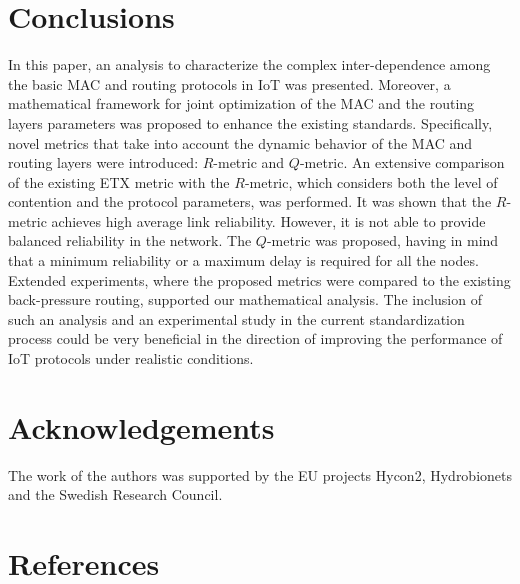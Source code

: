 \documentclass[review, 1p, 11pt]{elsarticle}
\numberwithin{equation}{section}
\begin{document}
\section{Conclusions} \label{sec:conclusions}
In this paper, an analysis to characterize the complex inter-dependence among the basic MAC and routing protocols in IoT was presented. Moreover, a mathematical framework for joint
optimization of the MAC and the routing layers parameters was proposed to enhance the existing standards.
Specifically, novel metrics that take into account the
dynamic behavior of the MAC and routing layers were introduced: $R$-metric and $Q$-metric. An extensive comparison of the existing ETX metric with the $R$-metric, which considers both the level of contention and the protocol parameters, was performed.
It was shown that the $R$-metric achieves high average link reliability. However, it is not able to provide balanced reliability in the network.
The $Q$-metric was proposed, having in mind that a minimum reliability or a maximum delay is required for all the nodes. Extended experiments, where the proposed metrics were compared to the existing back-pressure routing, supported our mathematical analysis.
The inclusion of such an analysis and an experimental study in the current
standardization process could be very beneficial in the direction of improving the
performance of IoT protocols under realistic conditions.

\section*{Acknowledgements}
The work of the authors was supported by the EU projects Hycon2, Hydrobionets and the Swedish Research Council.

\section*{References}


\end{document}
